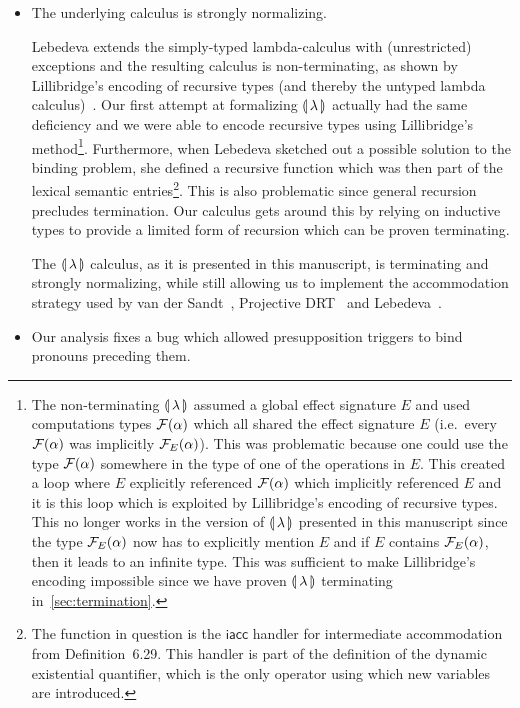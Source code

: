 \begin{itemize}
\item The underlying calculus is strongly normalizing.

  Lebedeva extends the simply-typed lambda-calculus with (unrestricted)
  exceptions and the resulting calculus is non-terminating, as shown by
  Lillibridge's encoding of recursive types (and thereby the untyped lambda
  calculus)~\cite{lillibridge1995exceptions}. Our first attempt at
  formalizing ${\llparenthesis \, \lambda \, \rrparenthesis}$ actually had the same deficiency and we were able to
  encode recursive types using Lillibridge's method\footnote{The
    non-terminating ${\llparenthesis \, \lambda \, \rrparenthesis}$ assumed a global effect signature $E$ and used
    computations types $\mathcal{F}(\alpha)$ which all shared the effect signature
    $E$ (i.e.\ every $\mathcal{F}(\alpha)$ was implicitly $\mathcal{F}_E(\alpha)$). This
    was problematic because one could use the type $\mathcal{F}(\alpha)$ somewhere
    in the type of one of the operations in $E$. This created a loop where
    $E$ explicitly referenced $\mathcal{F}(\alpha)$ which implicitly referenced $E$
    and it is this loop which is exploited by Lillibridge's encoding of
    recursive types. This no longer works in the version of ${\llparenthesis \, \lambda \, \rrparenthesis}$
    presented in this manuscript since the type $\mathcal{F}_E(\alpha)$ now has to
    explicitly mention $E$ and if $E$ contains $\mathcal{F}_E(\alpha)$, then it
    leads to an infinite type. This was sufficient to make Lillibridge's
    encoding impossible since we have proven ${\llparenthesis \, \lambda \, \rrparenthesis}$ terminating
    in~\ref{sec:termination}.}. Furthermore, when Lebedeva sketched out a
  possible solution to the binding problem, she defined a recursive
  function which was then part of the lexical semantic entries\footnote{The
    function in question is the $\textsf{iacc}$ handler for intermediate
    accommodation from Definition~6.29. This handler is part of the
    definition of the dynamic existential quantifier, which is the only
    operator using which new variables are introduced.}. This is also
  problematic since general recursion precludes termination. Our calculus
  gets around this by relying on inductive types to provide a limited form
  of recursion which can be proven terminating.

  The ${\llparenthesis \, \lambda \, \rrparenthesis}$ calculus, as it is presented in this manuscript, is
  terminating and strongly normalizing, while still allowing us to
  implement the accommodation strategy used by van der
  Sandt~\cite{van1992presupposition}, Projective
  DRT~\cite{venhuizen2013parsimonious} and
  Lebedeva~\cite{lebedeva2012expression}.

\item Our analysis fixes a bug which allowed presupposition triggers to
  bind pronouns preceding them.


\end{itemize}
